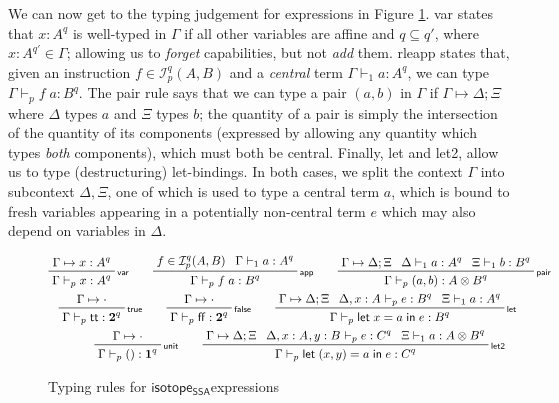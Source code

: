\documentclass[acmsmall,screen,review]{acmart}
\newcommand{\mc}[1]{\ensuremath{\mathcal{#1}}}
\newcommand{\mb}[1]{\ensuremath{\mathbf{#1}}}
\newcommand{\ms}[1]{\ensuremath{\mathsf{#1}}}
\newcommand{\lbl}[1]{{`#1}}
\newcommand{\ctt}{\ms{tt}}
\newcommand{\cff}{\ms{ff}}
\newcommand{\letexpr}[3]{\ensuremath{\ms{let}\;#1 = #2\;\ms{in}\;#3}}
\newcommand{\csplits}[3]{#1 \mapsto #2;#3}
\newcommand{\cwk}[2]{#1 \mapsto #2}
\newcommand{\thyp}[3]{#1: {#2}^{#3}}
\newcommand{\lhyp}[3]{#1[#2](#3)}
\newcommand{\llhyp}[3]{\lhyp{\lbl{#1}}{#2}{#3}}
\newcommand{\rle}[1]{{\scriptsize\textsf{#1}}}
\newcommand{\hasty}[5]{#1 \vdash_{#2} #3: {#4}^{#5}}
\newcommand{\haslb}[3]{#1 \vdash #2 \rhd #3}
\newcommand{\isotopessa}{\ms{isotope_{SSA}}}
\begin{document}
We can now get to the typing judgement for expressions in Figure
\ref{fig:ssa-term-typing}. \rle{var} states that \(\thyp{x}{A}{q}\) is
well-typed in \(\Gamma\) if all other variables are affine and \(q \subseteq
q'\), where \(\thyp{x}{A}{q'} \in \Gamma\); allowing us to \textit{forget}
capabilities, but not \textit{add} them. rle{app} states that, given an
instruction \(f \in \mc{I}_p^q(A, B)\) and a \textit{central} term
\(\hasty{\Gamma}{1}{a}{A}{q}\), we can type \(\hasty{\Gamma}{p}{f\;a}{B}{q}\).
The \rle{pair} rule says that we can type a pair \((a, b)\) in \(\Gamma\) if
\(\csplits{\Gamma}{\Delta}{\Xi}\) where \(\Delta\) types \(a\) and \(\Xi\) types
\(b\); the quantity of a pair is simply the intersection of the quantity of its
components (expressed by allowing any quantity which types \textit{both}
components), which must both be central. Finally, \rle{let} and \rle{let2},
allow us to type (destructuring) let-bindings. In both cases, we split the
context \(\Gamma\) into subcontext \(\Delta, \Xi\), one of which is used to type
a central term \(a\), which is bound to fresh variables appearing in a
potentially non-central term \(e\) which may also depend on variables in
\(\Delta\).

\begin{figure}
  \begin{gather*}    
    \prftree[r]{\rle{var}}
      {\cwk{\Gamma}{\thyp{x}{A}{q}}}
      {\hasty{\Gamma}{p}{x}{A}{q}} \qquad
    \prftree[r]{\rle{app}}
      {f \in \mc{I}_p^q(A, B)}
      {\hasty{\Gamma}{1}{a}{A}{q}}
      {\hasty{\Gamma}{p}{f\;a}{B}{q}} \qquad
    \prftree[r]{\rle{pair}}
      {\csplits{\Gamma}{\Delta}{\Xi}}
      {\hasty{\Delta}{1}{a}{A}{q}}
      {\hasty{\Xi}{1}{b}{B}{q}}
      {\hasty{\Gamma}{p}{(a, b)}{A \otimes B}{q}} \\
    \prftree[r]{\rle{true}}
      {\cwk{\Gamma}{\cdot}}
      {\hasty{\Gamma}{p}{\ctt}{\mb{2}}{q}} \qquad
    \prftree[r]{\rle{false}}
      {\cwk{\Gamma}{\cdot}}
      {\hasty{\Gamma}{p}{\cff}{\mb{2}}{q}} \qquad
    \prftree[r]{\rle{let}}
      {\csplits{\Gamma}{\Delta}{\Xi}}
      {\hasty{\Delta, \thyp{x}{A}{}}{p}{e}{B}{q}}
      {\hasty{\Xi}{1}{a}{A}{q}}
      {\hasty{\Gamma}{p}{\letexpr{x}{a}{e}}{B}{q}} \qquad
      \\
    \prftree[r]{\rle{unit}}
      {\cwk{\Gamma}{\cdot}}
      {\hasty{\Gamma}{p}{()}{\mb{1}}{q}} \qquad
    \prftree[r]{\rle{let2}}
      {\csplits{\Gamma}{\Delta}{\Xi}}
      {\hasty{\Delta, \thyp{x}{A}{}, \thyp{y}{B}{}}{p}{e}{C}{q}}
      {\hasty{\Xi}{1}{a}{A \otimes B}{q}}
      {\hasty{\Gamma}{p}{\letexpr{(x, y)}{a}{e}}{C}{q}}
  \end{gather*}
  \caption{Typing rules for \isotopessa expressions}
  \label{fig:ssa-term-typing}
\end{figure}
\end{document}
